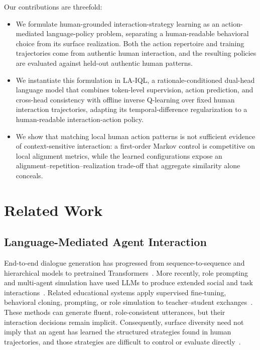 \documentclass[manuscript,review,anonymous]{acmart}
\begin{document}
Our contributions are threefold:
\begin{itemize}[leftmargin=*,itemsep=1pt,topsep=2pt]
    \item We formulate human-grounded interaction-strategy learning as an
    action-mediated language-policy problem, separating a human-readable
    behavioral choice from its surface realization. Both the action repertoire
    and training trajectories come from authentic human interaction, and the
    resulting policies are evaluated against held-out authentic human patterns.
    \item We instantiate this formulation in LA-IQL, a rationale-conditioned
    dual-head language model that combines token-level supervision, action
    prediction, and cross-head consistency with offline inverse Q-learning over
    fixed human interaction trajectories, adapting its temporal-difference
    regularization to a human-readable interaction-action policy.
    \item We show that matching local human action patterns is not sufficient
    evidence of context-sensitive interaction: a first-order Markov control is
    competitive on local alignment metrics, while the learned configurations
    expose an alignment--repetition--realization trade-off that aggregate
    similarity alone conceals.
\end{itemize}

\section{Related Work}

\subsection{Language-Mediated Agent Interaction}

End-to-end dialogue generation has progressed from sequence-to-sequence and hierarchical models to pretrained Transformers~\citep{sutskever2014sequence,serban2017hierarchical,vinyals2015neural}.
More recently, role prompting and multi-agent simulation have used LLMs to produce extended social and task interactions~\citep{park2023generative,xi2025rise}.
Related educational systems apply supervised fine-tuning, behavioral cloning, prompting, or role simulation to teacher--student exchanges~\citep{zhang2024simulating,tu2023littlemu,chu2025llm}.
These methods can generate fluent, role-consistent utterances, but their interaction decisions remain implicit.
Consequently, surface diversity need not imply that an agent has learned the
structured strategies found in human trajectories, and those strategies are
difficult to control or evaluate directly~\citep{li2016diversity,zhao2017learning}.
\end{document}
